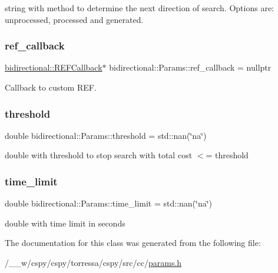 string with method to determine the next direction of search. Options are\+: unprocessed, processed and generated. \mbox{\label{classbidirectional_1_1Params_afa96dcebb31c930ea4bd339fc72779a5}} 
\subsubsection{\texorpdfstring{ref\+\_\+callback}{ref\_callback}}
{\footnotesize\ttfamily \hyperlink{classbidirectional_1_1REFCallback}{bidirectional\+::\+R\+E\+F\+Callback}$\ast$ bidirectional\+::\+Params\+::ref\+\_\+callback = nullptr}



Callback to custom R\+EF. 

\mbox{\label{classbidirectional_1_1Params_ac7099f442d46b684fcbe55ba9c6657e4}} 
\subsubsection{\texorpdfstring{threshold}{threshold}}
{\footnotesize\ttfamily double bidirectional\+::\+Params\+::threshold = std\+::nan(\char`\"{}na\char`\"{})}



double with threshold to stop search with total cost $<$= threshold 

\mbox{\label{classbidirectional_1_1Params_a2c0fd34b19d753cfce75690a5d68e1e1}} 
\subsubsection{\texorpdfstring{time\+\_\+limit}{time\_limit}}
{\footnotesize\ttfamily double bidirectional\+::\+Params\+::time\+\_\+limit = std\+::nan(\char`\"{}na\char`\"{})}



double with time limit in seconds 



The documentation for this class was generated from the following file\+:\begin{DoxyCompactItemize}
\item 
/\+\_\+\+\_\+w/cspy/cspy/torressa/cspy/src/cc/\hyperlink{params_8h}{params.\+h}\end{DoxyCompactItemize}
